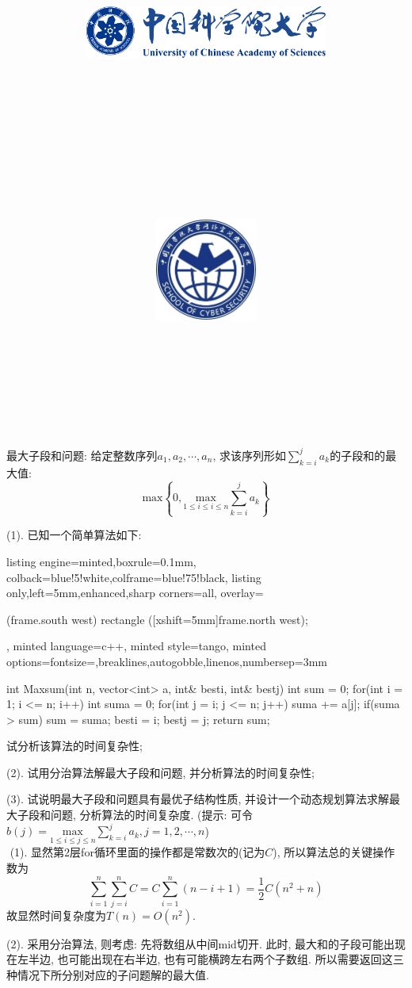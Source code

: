 \documentclass{article}
\title{
	\includegraphics[width=0.6\textwidth]{images/title/ucas_logo 1.pdf}\\
    \vspace{1in}
    \textmd{\textbf{\hmwkClass}}\\
	\textmd{\Large{\textbf{\hmwkClassID}}}\\
    \textmd{\textbf{\hmwkTitle}}\\
    \normalsize\vspace{0.1in}\large{\hmwkCompleteTime }\\
    \vspace{0.1in}\large{\textit{\hmwkClassInstructor\ }}\\
    \vspace{1in}
	\includegraphics[width=0.25\textwidth]{images/title/Cyber.jpg}\\
	\vspace{1in}
}
\author{
	\hmwkAuthorName \\ 
	\hmwkAuthorStuID \\
	\hmwkAuthorInst \\
	\hmwkAuthorzhuanye \\
	\hmwkAuthorfangxiang
	}
\date{}
\begin{document}
\maketitle


%
%
%
%
%


\pagebreak



\begin{homeworkProblem}
	最大子段和问题: 给定整数序列$a_1, a_2, \cdots, a_n$, 求该序列形如$\displaystyle \sum_{k=i}^j a_k$的子段和的最大值: $$\displaystyle \text{max} \left\{0, \underset{1\le i\le i\le n}{\text{max}} \sum_{k=i}^j a_k\right\}$$
	
	(1). 已知一个简单算法如下:
\begin{tcblisting}{listing engine=minted,boxrule=0.1mm,
colback=blue!5!white,colframe=blue!75!black,
listing only,left=5mm,enhanced,sharp corners=all,
overlay={\begin{tcbclipinterior} (frame.south west)
rectangle ([xshift=5mm]frame.north west);\end{tcbclipinterior}},
minted language=c++,
minted style=tango,
minted options={fontsize=\small,breaklines,autogobble,linenos,numbersep=3mm}}
int Maxsum(int n, vector<int> a, int& besti, int& bestj) {
    int sum = 0;
    for(int i = 1; i <= n; i++) {
        int suma = 0;
        for(int j = i; j <= n; j++) {
            suma += a[j];
            if(suma > sum) {
                sum = suma;
                besti = i;
                bestj = j;
            }
        }
    }
    return sum;
}
\end{tcblisting}
	试分析该算法的时间复杂性;

	(2). 试用分治算法解最大子段和问题, 并分析算法的时间复杂性;

	(3). 试说明最大子段和问题具有最优子结构性质, 并设计一个动态规划算法求解最大子段和问题, 分析算法的时间复杂度. (提示: 可令$\displaystyle b\left( j \right) =\underset{1\le i\le j\le n}{\text{max}}\sum_{k=i}^j{a_k}, j=1,2,\cdots ,n$)
	\\

	\solution \,\,(1). 显然第2层for循环里面的操作都是常数次的(记为$C$), 所以算法总的关键操作数为$$\sum_{i=1}^n{\sum_{j=i}^n{C}}=C\sum_{i=1}^n{\left( n-i+1 \right)}=\frac{1}{2}C\left( n^2+n \right) 
	$$
	故显然时间复杂度为$T(n)=O(n^2)$.

	(2). 采用分治算法, 则考虑: 先将数组从中间mid切开. 此时, 最大和的子段可能出现在左半边, 也可能出现在右半边, 也有可能横跨左右两个子数组. 所以需要返回这三种情况下所分别对应的子问题解的最大值. 


\end{homeworkProblem}
\end{document}
